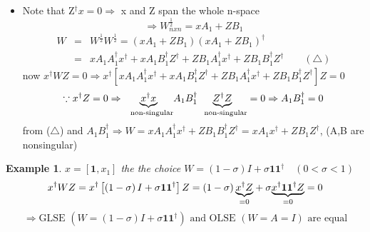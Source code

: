 \documentclass{article}
\newtheorem{example}[theorem]{Example}
\begin{document}
\begin{itemize}
\item Note that Z$^{\dagger }x=0\Rightarrow $ x and Z span the whole n-space%
\begin{equation*}
\Rightarrow W_{nxn}^{\frac{1}{2}}=xA_{1}+ZB_{1}
\end{equation*}%
\begin{eqnarray*}
W &=&W^{\frac{1}{2}}W^{\frac{1}{2}}=\left( xA_{1}+ZB_{1}\right) \left(
xA_{1}+ZB_{1}\right) ^{\dagger } \\
&=&xA_{1}A_{1}^{\dagger }x^{\dagger }+xA_{1}B_{1}^{\dagger }Z^{\dagger
}+ZB_{1}A_{1}^{\dagger }x^{\dagger }+ZB_{1}B_{1}^{\dagger }Z^{\dagger
}\qquad \left( \triangle \right) 
\end{eqnarray*}%
now $x^{\dagger }WZ=0\Rightarrow x^{\dagger }\left[ xA_{1}A_{1}^{\dagger
}x^{\dagger }+xA_{1}B_{1}^{\dagger }Z^{\dagger }+ZB_{1}A_{1}^{\dagger
}x^{\dagger }+ZB_{1}B_{1}^{\dagger }Z^{\dagger }\right] Z=0$%
\begin{equation*}
\because x^{\dagger }Z=0\Rightarrow \underset{\text{non-singular}}{%
\underbrace{x^{\dagger }x}}A_{1}B_{1}^{\dagger }\underset{\text{non-singular}%
}{\underbrace{Z^{\dagger }Z}}=0\Rightarrow A_{1}B_{1}^{\dagger }=0
\end{equation*}%
from ($\triangle $) and $A_{1}B_{1}^{\dagger }\Rightarrow
W=xA_{1}A_{1}^{\dagger }x^{\dagger }+ZB_{1}B_{1}^{\dagger }Z^{\dagger
}=xA_{1}x^{\dagger }+ZB_{1}Z^{\dagger }$, (A,B are nonsingular)
\end{itemize}

\bigskip

\begin{example}
$x=\left[ \boldsymbol{1},x_{1}\right] $ the the choice $W=\left( 1-\sigma
\right) I+\sigma \boldsymbol{11}^{\dagger }\quad \left( 0<\sigma <1\right) $%
\begin{equation*}
x^{\dagger }WZ=x^{\dagger }\left[ \left( 1-\sigma \right) I+\sigma 
\boldsymbol{11}^{\dagger }\right] Z=\left( 1-\sigma \right) \underset{=0}{%
\underbrace{x^{\dagger }Z}}+\sigma \underset{=0}{\underbrace{x^{\dagger }%
\boldsymbol{11}^{\dagger }Z}}=0
\end{equation*}%
\begin{equation*}
\Rightarrow \text{GLSE }\left( W=\left( 1-\sigma \right) I+\sigma 
\boldsymbol{11}^{\dagger }\right) \text{ and OLSE }(W=A=I)\text{ are equal}
\end{equation*}
\end{example}

\bigskip
\end{document}
